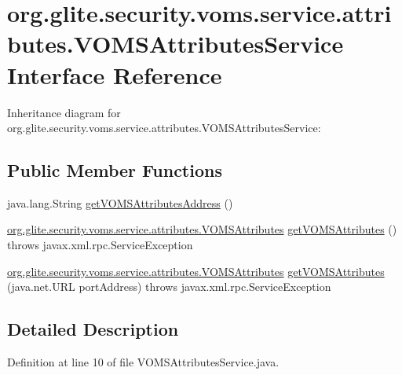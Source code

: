 \hypertarget{interfaceorg_1_1glite_1_1security_1_1voms_1_1service_1_1attributes_1_1VOMSAttributesService}{
\section{org.glite.security.voms.service.attributes.VOMSAttributesService Interface Reference}
\label{interfaceorg_1_1glite_1_1security_1_1voms_1_1service_1_1attributes_1_1VOMSAttributesService}
}


Inheritance diagram for org.glite.security.voms.service.attributes.VOMSAttributesService:
\subsection*{Public Member Functions}
\begin{DoxyCompactItemize}
\item 
java.lang.String \hyperlink{interfaceorg_1_1glite_1_1security_1_1voms_1_1service_1_1attributes_1_1VOMSAttributesService_ab4419b6bb9b110b6024e4dff1c7adb6a}{getVOMSAttributesAddress} ()
\item 
\hyperlink{interfaceorg_1_1glite_1_1security_1_1voms_1_1service_1_1attributes_1_1VOMSAttributes}{org.glite.security.voms.service.attributes.VOMSAttributes} \hyperlink{interfaceorg_1_1glite_1_1security_1_1voms_1_1service_1_1attributes_1_1VOMSAttributesService_a52534b33370338d04135d31534432406}{getVOMSAttributes} ()  throws javax.xml.rpc.ServiceException
\item 
\hyperlink{interfaceorg_1_1glite_1_1security_1_1voms_1_1service_1_1attributes_1_1VOMSAttributes}{org.glite.security.voms.service.attributes.VOMSAttributes} \hyperlink{interfaceorg_1_1glite_1_1security_1_1voms_1_1service_1_1attributes_1_1VOMSAttributesService_a9b6cb66a299183714447f6596d448dee}{getVOMSAttributes} (java.net.URL portAddress)  throws javax.xml.rpc.ServiceException
\end{DoxyCompactItemize}


\subsection{Detailed Description}


Definition at line 10 of file VOMSAttributesService.java.



